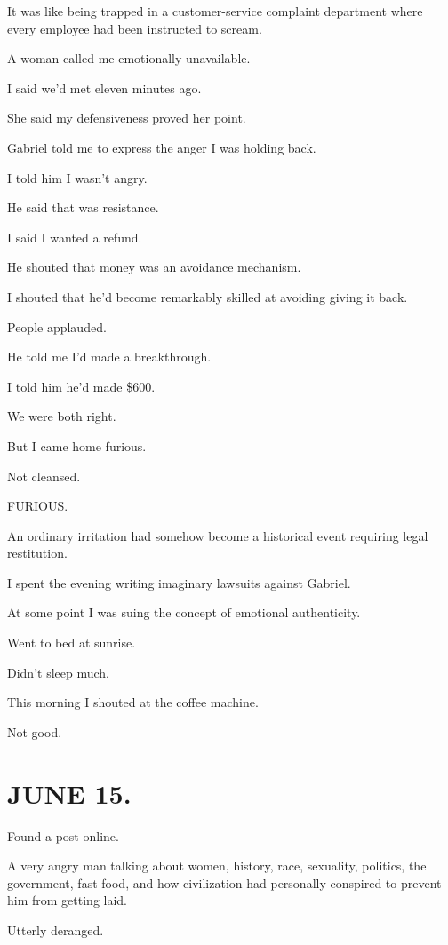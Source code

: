 \documentclass[11pt,oneside]{book}
\begin{document}
It was like being trapped in a customer-service complaint department where every employee had been instructed to scream.

A woman called me emotionally unavailable.

I said we'd met eleven minutes ago.

She said my defensiveness proved her point.

Gabriel told me to express the anger I was holding back.

I told him I wasn't angry.

He said that was resistance.

I said I wanted a refund.

He shouted that money was an avoidance mechanism.

I shouted that he'd become remarkably skilled at avoiding giving it back.

People applauded.

He told me I'd made a breakthrough.

I told him he'd made \$600.

We were both right.

But I came home furious.

Not cleansed.

FURIOUS.

An ordinary irritation had somehow become a historical event requiring legal restitution.

I spent the evening writing imaginary lawsuits against Gabriel.

At some point I was suing the concept of emotional authenticity.

Went to bed at sunrise.

Didn't sleep much.

This morning I shouted at the coffee machine.

Not good.

\section*{JUNE 15.}

Found a post online.

A very angry man talking about women, history, race, sexuality, politics, the government, fast food, and how civilization had personally conspired to prevent him from getting laid.

Utterly deranged.
\end{document}
